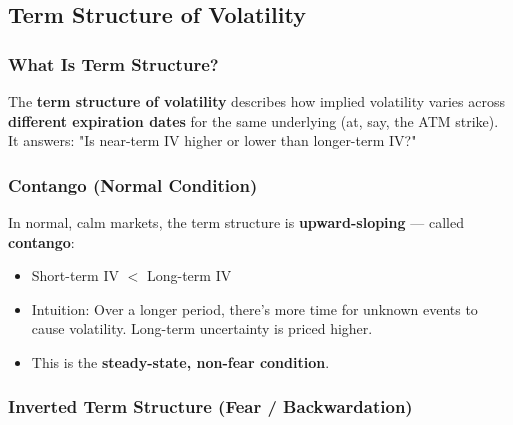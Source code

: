 \documentclass[12pt,openany]{book}
\begin{document}
\subsection{Term Structure of Volatility}

\subsubsection{What Is Term Structure?}

The \textbf{term structure of volatility} describes how implied volatility varies across \textbf{different expiration dates} for the same underlying (at, say, the ATM strike). It answers: "Is near-term IV higher or lower than longer-term IV?"

\subsubsection{Contango (Normal Condition)}

In normal, calm markets, the term structure is \textbf{upward-sloping} — called \textbf{contango}:


\begin{center}
\end{center}


\begin{itemize}[leftmargin=*]
    \item Short-term IV \(<\) Long-term IV
    \item Intuition: Over a longer period, there's more time for unknown events to cause volatility. Long-term uncertainty is priced higher.
    \item This is the \textbf{steady-state, non-fear condition}.
\end{itemize}

\subsubsection{Inverted Term Structure (Fear / Backwardation)}
\end{document}

